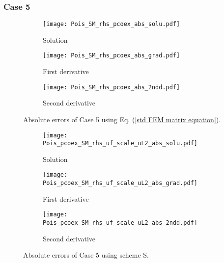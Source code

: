 \documentclass[final,3p]{elsarticle}
\begin{document}
\pagebreak
\subsubsection{Case 5}

\begin{figure}[!ht]
    \begin{subfigure}{5.5cm}
        \texttt{[image: Pois\_SM\_rhs\_pcoex\_abs\_solu.pdf]}
        \caption{Solution}
        \label{Fig:Pois_SM_rhs_pcoex_abs_solu}
    \end{subfigure}
    \begin{subfigure}{5.5cm}
        \texttt{[image: Pois\_SM\_rhs\_pcoex\_abs\_grad.pdf]}
        \caption{First derivative}
        \label{Fig:Pois_SM_rhs_pcoex_abs_grad}
    \end{subfigure}
    \begin{subfigure}{5.5cm}
        \texttt{[image: Pois\_SM\_rhs\_pcoex\_abs\_2ndd.pdf]}
        \caption{Second derivative}
        \label{Fig:Pois_SM_rhs_pcoex_abs_2ndd}
    \end{subfigure}
\caption{Absolute errors of Case 5 using Eq. (\ref{std FEM matrix equation}).}
\label{Pois_SM_rhs_pcoex_abs}
\end{figure}

\begin{figure}[!ht]
    \begin{subfigure}{5.5cm}
        \texttt{[image: Pois\_pcoex\_SM\_rhs\_uf\_scale\_uL2\_abs\_solu.pdf]}
        \caption{Solution}
        \label{Fig:Pois_pcoex_SM_rhs_uf_scale_uL2_abs_solu}
    \end{subfigure}
    \begin{subfigure}{5.5cm}
        \texttt{[image: Pois\_pcoex\_SM\_rhs\_uf\_scale\_uL2\_abs\_grad.pdf]}
        \caption{First derivative}
        \label{Fig:Pois_pcoex_SM_rhs_uf_scale_uL2_abs_grad}
    \end{subfigure}
    \begin{subfigure}{5.5cm}
        \texttt{[image: Pois\_pcoex\_SM\_rhs\_uf\_scale\_uL2\_abs\_2ndd.pdf]}
        \caption{Second derivative}
        \label{Fig:Pois_pcoex_SM_rhs_uf_scale_uL2_abs_2ndd}
    \end{subfigure}
\caption{Absolute errors of Case 5 using scheme $\text{S}$.}
\label{Pois_pcoex_SM_rhs_uf_scale_uL2_abs}
\end{figure}
\end{document}
